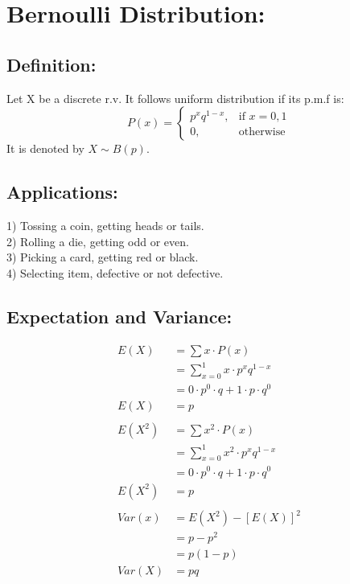 \documentclass[
10pt, %
a4paper, %
]{report}
\begin{document}
\newpage

\section*{Bernoulli Distribution:}
\subsection*{Definition:}
Let X be a discrete r.v. It follows uniform distribution if its p.m.f is:
\[
    P(x)= 
\begin{cases}
    p^x q^{1-x},    & \text{if } x = 0,1\\
    0,              & \text{otherwise}
\end{cases}
\]
It is denoted by \(X \sim B(p).\)

\subsection*{Applications:}
1) Tossing a coin, getting heads or tails. \\
2) Rolling a die, getting odd or even. \\
3) Picking a card, getting red or black. \\
4) Selecting item, defective or not defective.

\subsection*{Expectation and Variance:}
\begin{align*}
    E(X) &= \sum x \cdot P(x) \\
         &= \sum_{x=0}^1 x\cdot p^x q^{1-x} \\
         &= 0\cdot p^0 \cdot q + 1\cdot p \cdot q^0 \\
    E(X) &= p \\ \\
    E(X^2) &= \sum x^2 \cdot P(x) \\
           &= \sum_{x=0}^1 x^2\cdot p^x q^{1-x} \\
           &= 0\cdot p^0 \cdot q + 1\cdot p \cdot q^0 \\
    E(X^2) &= p \\ \\
    Var(x) &= E(X^2) - [E(X)]^2 \\
           &= p-p^2 \\
           &= p(1-p) \\
    Var(X) &= pq
\end{align*}
\end{document}
